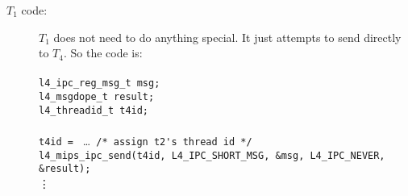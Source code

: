 \begin{description}

\item[$T_1$ code:]  
  $T_1$ does not need to do anything special. It just attempts to
  send directly to $T_4$. So the code is: \\ \\
  \hspace*{10pt} {\footnotesize\verb+l4_ipc_reg_msg_t msg;+} \\
  \hspace*{10pt} {\footnotesize\verb+l4_msgdope_t result;+} \\
  \hspace*{10pt} {\footnotesize\verb+l4_threadid_t t4id;+} \\ \\
  \hspace*{10pt} {\footnotesize\verb+t4id = +} \dots {\footnotesize\verb+ /* assign t2's thread id */+}\\
  \hspace*{10pt} {\footnotesize\verb+l4_mips_ipc_send(t4id, L4_IPC_SHORT_MSG, &msg, L4_IPC_NEVER, &result);+} \\
  \hspace*{40pt} \vdots   
  

\end{description}
